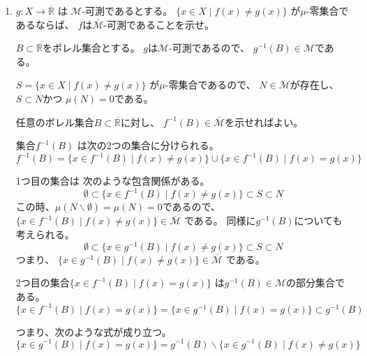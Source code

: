 \documentclass[12pt,b5paper]{ltjsarticle}
\begin{document}
\begin{enumerate}
 \item
      $g: X\to \overline{\mathbb{R}}$
      は
      $\mathcal{M}$-可測であるとする。
      $\{ x\in X \mid f(x)\ne g(x)\}$
      が$\mu$-零集合で
      あるならば、
      $f$は$\overline{\mathcal{M}}$-可測であることを示せ。

      \dotfill


      $B \subset \overline{\mathbb{R}}$をボレル集合とする。
      $g$は$\mathcal{M}$-可測であるので、
      $g^{-1}(B)\in\mathcal{M}$である。

      $S=\{ x\in X \mid f(x)\ne g(x) \}$
      が$\mu$-零集合であるので、
      $N\in\mathcal{M}$が存在し、
      $S \subset N$かつ
      $\mu(N)=0$である。

      任意のボレル集合$B \subset \overline{\mathbb{R}}$に対し、
      $f^{-1}(B)\in\overline{\mathcal{M}}$を示せればよい。
      
      集合$f^{-1}(B)$
      は次の2つの集合に分けられる。
      \begin{equation}
       f^{-1}(B)
        = \{ x\in f^{-1}(B) \mid f(x)\ne g(x) \}
        \cup \{ x\in f^{-1}(B) \mid f(x) = g(x) \}
      \end{equation}

      1つ目の集合は
      次のような包含関係がある。
      \begin{equation}
       \emptyset \subset \{ x\in f^{-1}(B) \mid f(x)\ne g(x) \} \subset S \subset N
      \end{equation}
      この時、$\mu(N\backslash \emptyset) = \mu(N) =0$であるので、
      $\{ x\in f^{-1}(B) \mid f(x)\ne g(x) \} \in \overline{\mathcal{M}}$
      である。
      同様に$g^{-1}(B)$についても考えられる。
      \begin{equation}
       \emptyset
        \subset \{ x\in g^{-1}(B) \mid f(x)\ne g(x) \}
        \subset S \subset N
      \end{equation}
      つまり、
      $\{ x\in g^{-1}(B) \mid f(x)\ne g(x) \} \in \overline{\mathcal{M}}$
      である。

      2つ目の集合$\{ x\in f^{-1}(B) \mid f(x) = g(x) \}$
      は$g^{-1}(B)\in\mathcal{M}$の部分集合である。
      \begin{equation}
       \{ x\in f^{-1}(B) \mid f(x) = g(x) \}
        = \{ x\in g^{-1}(B) \mid f(x) = g(x) \}
        \subset g^{-1}(B)
      \end{equation}

      つまり、次のような式が成り立つ。
      \begin{equation}
       \{ x\in g^{-1}(B) \mid f(x)= g(x) \}
        = g^{-1}(B) \backslash \{ x\in g^{-1}(B) \mid f(x)\ne g(x) \}
      \end{equation}


\end{enumerate}
\end{document}
